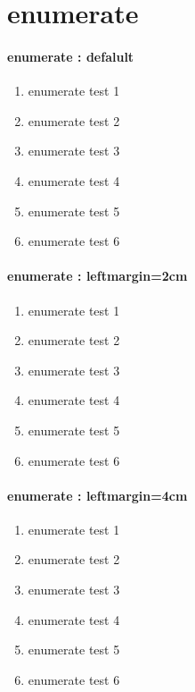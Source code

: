 \documentclass[12pt, a4paper, oneside]{book}
\let\stdsection\section
\renewcommand\section{\newpage\stdsection}
\begin{document}
	\section{enumerate}


		\paragraph{enumerate : defalult}
			\begin{enumerate}
			\setlength\topsep{0.0em}
			\setlength\itemsep{-1.0em}
			\setlength{}
			\setlength{}
	
			\item	enumerate test 1
			\item	enumerate test 2
			\item	enumerate test 3
			\item	enumerate test 4
			\item	enumerate test 5
			\item	enumerate test 6
			\end{enumerate}

		\paragraph{enumerate : leftmargin=2cm}
			\begin{enumerate}[ leftmargin=2cm ]
			\setlength\topsep{0.0em}
			\setlength\itemsep{-1.0em}
			\setlength{}
			\setlength{}
	
			\item	enumerate test 1
			\item	enumerate test 2
			\item	enumerate test 3
			\item	enumerate test 4
			\item	enumerate test 5
			\item	enumerate test 6
			\end{enumerate}


		\paragraph{enumerate : leftmargin=4cm}
			\begin{enumerate}[leftmargin=4cm]
			\setlength\topsep{0.0em}
			\setlength\itemsep{-1.0em}
			\setlength\leftmargin{0cm}
			\setlength\rightmargin{6cm}
	
			\setlength{}
			\setlength{}
			\setlength\listparindent{0.0em}
	
			\item	enumerate test 1
			\item	enumerate test 2
			\item	enumerate test 3
			\item	enumerate test 4
			\item	enumerate test 5
			\item	enumerate test 6
			\end{enumerate}
\end{document}
